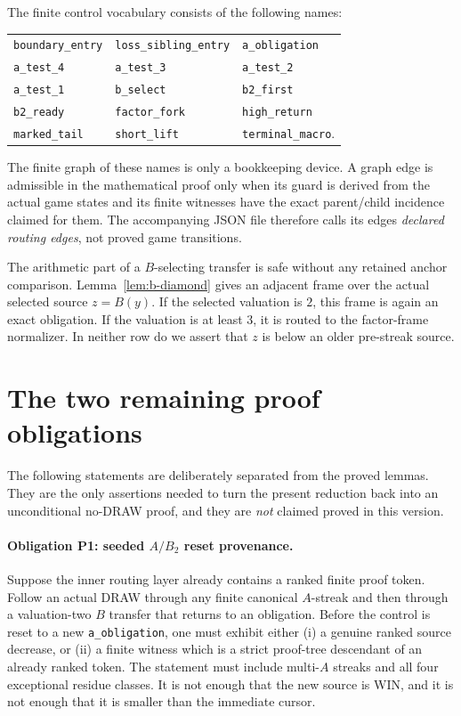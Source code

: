 The finite control vocabulary consists of the following names:
\begin{center}
\begin{tabular}{lll}
\texttt{boundary\_entry} & \texttt{loss\_sibling\_entry} & \texttt{a\_obligation}\\
\texttt{a\_test\_4} & \texttt{a\_test\_3} & \texttt{a\_test\_2}\\
\texttt{a\_test\_1} & \texttt{b\_select} & \texttt{b2\_first}\\
\texttt{b2\_ready} & \texttt{factor\_fork} & \texttt{high\_return}\\
\texttt{marked\_tail} & \texttt{short\_lift} & \texttt{terminal\_macro}.
\end{tabular}
\end{center}
The finite graph of these names is only a bookkeeping device.  A graph edge is
admissible in the mathematical proof only when its guard is derived from the
actual game states and its finite witnesses have the exact parent/child
incidence claimed for them.  The accompanying JSON file therefore calls its
edges \emph{declared routing edges}, not proved game transitions.

The arithmetic part of a $B$-selecting transfer is safe without any retained
anchor comparison.  Lemma~\ref{lem:b-diamond} gives an adjacent frame over the
actual selected source $z=B(y)$.  If the selected valuation is $2$, this frame
is again an exact obligation.  If the valuation is at least $3$, it is routed
to the factor-frame normalizer.  In neither row do we assert that $z$ is below
an older pre-streak source.

\section{The two remaining proof obligations}\label{sec:remaining}

The following statements are deliberately separated from the proved lemmas.
They are the only assertions needed to turn the present reduction back into an
unconditional no-DRAW proof, and they are \emph{not} claimed proved in this
version.

\paragraph{Obligation P1: seeded $A/B_2$ reset provenance.}
Suppose the inner routing layer already contains a ranked finite proof token.
Follow an actual DRAW through any finite canonical $A$-streak and then through
a valuation-two $B$ transfer that returns to an obligation.  Before the
control is reset to a new \texttt{a\_obligation}, one must exhibit either
(i) a genuine ranked source decrease, or (ii) a finite witness which is a
strict proof-tree descendant of an already ranked token.  The statement must
include multi-$A$ streaks and all four exceptional residue classes.  It is not
enough that the new source is WIN, and it is not enough that it is smaller
than the immediate cursor.

